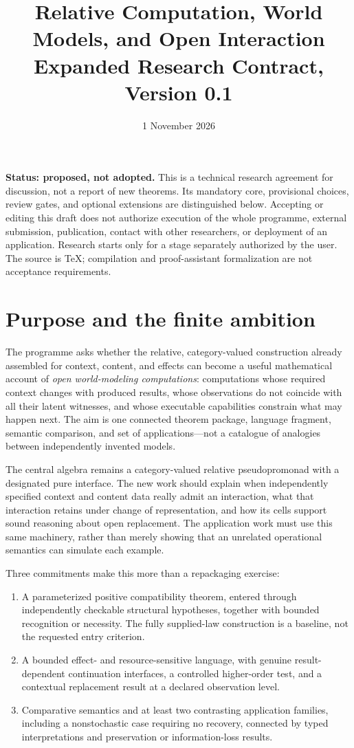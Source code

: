 \documentclass[11pt,a4paper]{article}
\title{Relative Computation, World Models, and Open Interaction\\[5pt]
\large Expanded Research Contract, Version 0.1}
\author{}
\date{1 November 2026}
\begin{document}
\maketitle
\vspace{-1em}

\textbf{Status: proposed, not adopted.}
This is a technical research agreement for discussion, not a report of new
theorems. Its mandatory core, provisional choices, review gates, and optional
extensions are distinguished below. Accepting or editing this draft does not
authorize execution of the whole programme, external submission, publication,
contact with other researchers, or deployment of an application. Research
starts only for a stage separately authorized by the user. The source is TeX;
compilation and proof-assistant formalization are not acceptance requirements.

\section{Purpose and the finite ambition}\label{sec:purpose}

The programme asks whether the relative, category-valued construction already
assembled for context, content, and effects can become a useful mathematical
account of \emph{open world-modeling computations}: computations whose required
context changes with produced results, whose observations do not coincide with
all their latent witnesses, and whose executable capabilities constrain what
may happen next. The aim is one connected theorem package, language fragment,
semantic comparison, and set of applications---not a catalogue of analogies
between independently invented models.

The central algebra remains a category-valued relative pseudopromonad with a
designated pure interface. The new work should explain when independently
specified context and content data really admit an interaction, what that
interaction retains under change of representation, and how its cells support
sound reasoning about open replacement. The application work must use this
same machinery, rather than merely showing that an unrelated operational
semantics can simulate each example.

Three commitments make this more than a repackaging exercise:
\begin{enumerate}
\item A parameterized positive compatibility theorem, entered through
independently checkable structural hypotheses, together with bounded
recognition or necessity. The fully supplied-law construction is a baseline,
not the requested entry criterion.
\item A bounded effect- and resource-sensitive language, with genuine
result-dependent continuation interfaces, a controlled higher-order test,
and a contextual replacement result at a declared observation level.
\item Comparative semantics and at least two contrasting application families,
including a nonstochastic case requiring no recovery, connected by typed
interpretations and preservation or information-loss results.
\end{enumerate}
\end{document}
